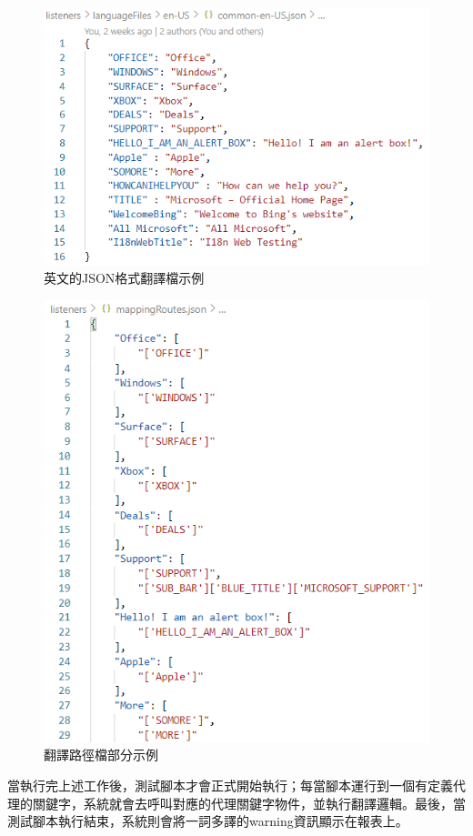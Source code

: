 \begin{figure}[H]
    \centering
    \includegraphics[width= .7\textwidth]{../論文截圖/3-1-3-2 JSON格式翻譯檔.png}
    \caption{英文的JSON格式翻譯檔示例}
    \label{英文的JSON格式翻譯檔示例}
\end{figure}

\begin{figure}[H]
    \centering
    \includegraphics[width= .7\textwidth]{../論文截圖/3-1-3-3 翻譯路徑檔.png}
    \caption{翻譯路徑檔部分示例}
    \label{翻譯路徑檔}
\end{figure}
當執行完上述工作後，測試腳本才會正式開始執行；每當腳本運行到一個有定義代理的關鍵字，系統就會去呼叫對應的代理關鍵字物件，並執行翻譯邏輯。最後，當測試腳本執行結束，系統則會將一詞多譯的warning資訊顯示在報表上。
